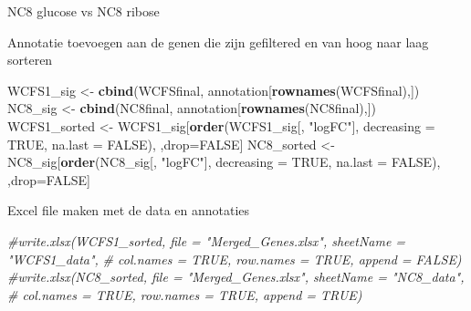 \documentclass[
]{article}
\newenvironment{Shaded}{\begin{snugshade}}{\end{snugshade}}
\newcommand{\CommentTok}[1]{\textcolor[rgb]{0.56,0.35,0.01}{\textit{#1}}}
\newcommand{\DataTypeTok}[1]{\textcolor[rgb]{0.13,0.29,0.53}{#1}}
\newcommand{\DecValTok}[1]{\textcolor[rgb]{0.00,0.00,0.81}{#1}}
\newcommand{\FloatTok}[1]{\textcolor[rgb]{0.00,0.00,0.81}{#1}}
\newcommand{\KeywordTok}[1]{\textcolor[rgb]{0.13,0.29,0.53}{\textbf{#1}}}
\newcommand{\NormalTok}[1]{#1}
\newcommand{\OperatorTok}[1]{\textcolor[rgb]{0.81,0.36,0.00}{\textbf{#1}}}
\newcommand{\OtherTok}[1]{\textcolor[rgb]{0.56,0.35,0.01}{#1}}
\newcommand{\StringTok}[1]{\textcolor[rgb]{0.31,0.60,0.02}{#1}}
\begin{document}
NC8 glucose vs NC8 ribose

\begin{Shaded}
\end{Shaded}

Annotatie toevoegen aan de genen die zijn gefiltered en van hoog naar
laag sorteren

\begin{Shaded}
\begin{Highlighting}[]
\NormalTok{WCFS1_sig <-}\StringTok{ }\KeywordTok{cbind}\NormalTok{(WCFSfinal, annotation[}\KeywordTok{rownames}\NormalTok{(WCFSfinal),])}
\NormalTok{NC8_sig <-}\StringTok{ }\KeywordTok{cbind}\NormalTok{(NC8final, annotation[}\KeywordTok{rownames}\NormalTok{(NC8final),])}
\NormalTok{WCFS1_sorted <-}\StringTok{ }\NormalTok{WCFS1_sig[}\KeywordTok{order}\NormalTok{(WCFS1_sig[, }\StringTok{"logFC"}\NormalTok{], }\DataTypeTok{decreasing =} \OtherTok{TRUE}\NormalTok{, }\DataTypeTok{na.last =} \OtherTok{FALSE}\NormalTok{), ,drop=}\OtherTok{FALSE}\NormalTok{]}
\NormalTok{NC8_sorted <-}\StringTok{ }\NormalTok{NC8_sig[}\KeywordTok{order}\NormalTok{(NC8_sig[, }\StringTok{"logFC"}\NormalTok{], }\DataTypeTok{decreasing =} \OtherTok{TRUE}\NormalTok{, }\DataTypeTok{na.last =} \OtherTok{FALSE}\NormalTok{), ,drop=}\OtherTok{FALSE}\NormalTok{]}
\end{Highlighting}
\end{Shaded}

Excel file maken met de data en annotaties

\begin{Shaded}
\begin{Highlighting}[]
\CommentTok{#write.xlsx(WCFS1_sorted, file = "Merged_Genes.xlsx", sheetName = "WCFS1_data", }
\CommentTok{#  col.names = TRUE, row.names = TRUE, append = FALSE)}
\CommentTok{#write.xlsx(NC8_sorted, file = "Merged_Genes.xlsx", sheetName = "NC8_data", }
\CommentTok{#  col.names = TRUE, row.names = TRUE, append = TRUE)}
\end{Highlighting}
\end{Shaded}
\end{document}
